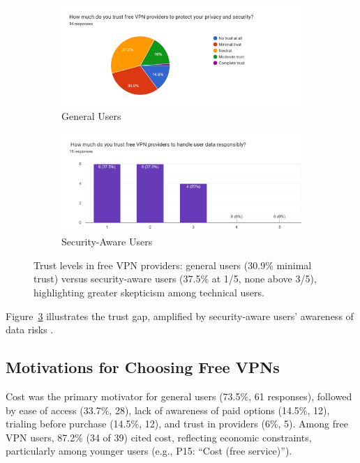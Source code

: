 \documentclass[11pt,a4paper]{article}
\begin{document}
\begin{figure}[ht]
    \centering
    \begin{subfigure}[t]{1.0\columnwidth}
        \centering
        \includegraphics[width=\linewidth]{generalusertrust.png}
        \caption{General Users}
        \label{fig:general_trust}
    \end{subfigure}
    \hfill
    \begin{subfigure}[t]{1.0\columnwidth}
        \centering
        \includegraphics[width=\linewidth]{securityusertrust.png}
        \caption{Security-Aware Users}
        \label{fig:security_trust}
    \end{subfigure}
    \caption{Trust levels in free VPN providers: general users (30.9\% minimal trust) versus security-aware users (37.5\% at 1/5, none above 3/5), highlighting greater skepticism among technical users.}
    \label{fig:trust_levels_comparison}
\end{figure}

Figure~\ref{fig:trust_levels_comparison} illustrates the trust gap, amplified by security-aware users’ awareness of data risks \citep{Ikram2016, Khan2018}.
\subsection{Motivations for Choosing Free VPNs}
Cost was the primary motivator for general users (73.5\%, 61 responses), followed by ease of access (33.7\%, 28), lack of awareness of paid options (14.5\%, 12), trialing before purchase (14.5\%, 12), and trust in providers (6\%, 5). Among free VPN users, 87.2\% (34 of 39) cited cost, reflecting economic constraints, particularly among younger users (e.g., P15: ``Cost (free service)'').
\end{document}
